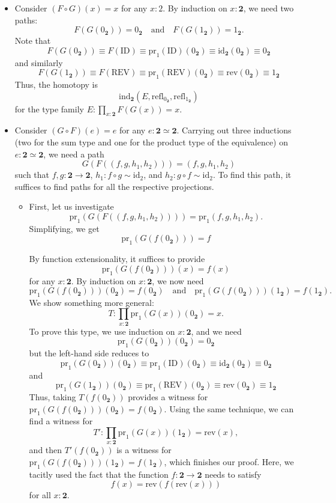 \documentclass[14pt]{extarticle}
\newcommand{\0}{{\mathbf 0}}
\newcommand{\1}{{\mathbf 1}}
\newcommand{\2}{{\mathbf 2}}
\newcommand{\ind}{\mathrm{ind}}
\newcommand{\refl}{\mathrm{refl}}
\newcommand{\pr}{\mathrm{pr}}
\newcommand{\id}{\mathrm{id}}
\begin{document}
\begin{itemize}
\item Consider $(F \circ G)(x) = x$ for any $x:2$. By induction on $x : \2$, we need two paths:
\[F(G(0_\2)) = 0_\2 \quad \text{and} \quad F(G(1_\2)) = 1_\2.\] Note that
\[F(G(0_\2)) \equiv F(\text{ID}) \equiv \pr_1(\text{ID})(0_\2) \equiv \id_\2(0_\2) \equiv 0_\2\] and similarly 
\[F(G(1_\2)) \equiv F(\text{REV}) \equiv \pr_1(\text{REV})(0_\2) \equiv \text{rev}(0_\2) \equiv 1_\2\] Thus, the homotopy is 
\[\ind_\2(E, \refl_{0_\2}, \refl_{1_\2})\]
for the type family $E : \prod_{x:\2} F(G(x)) = x$.

\item Consider $(G \circ F)(e) = e$ for any $e:\2 \simeq \2$. Carrying out three inductions (two for the sum type and one for the product type of the equivalence) on $e : \2 \simeq \2$, we need a path
\[G(F((f,g,h_1,h_2))) = (f,g,h_1,h_2)\] such that $f,g : \2 \to \2$, $h_1 : f \circ g \sim \id_2$, and $h_2 : g \circ f \sim \id_2$. To find this path, it suffices to find paths for all the respective projections.

\begin{itemize}
\item First, let us investigate \[\pr_1(G(F((f,g,h_1,h_2)))) = \pr_1(f,g,h_1,h_2).\] Simplifying, we get
\[\pr_1(G(f(0_\2))) = f\]

By function extensionality, it suffices to provide
\[\pr_1(G(f(0_\2)))(x) = f(x)\] for any $x : \2$. By induction on $x : \2$, we now need
\[\pr_1(G(f(0_\2)))(0_\2) = f(0_\2) \quad \text{and} \quad \pr_1(G(f(0_\2)))(1_\2) = f(1_\2).\] We show something more general:
\[T : \prod_{x:\2}\pr_1(G(x))(0_\2) = x.\] To prove this type, we use induction on $x : \2$, and we need
\[\pr_1(G(0_\2))(0_\2) = 0_\2\] but the left-hand side reduces to
\[\pr_1(G(0_\2))(0_\2) \equiv \pr_1(\text{ID})(0_\2) \equiv \id_\2(0_\2) \equiv 0_\2\] and 
\[\pr_1(G(1_\2))(0_\2) \equiv \pr_1(\text{REV})(0_\2) \equiv \text{rev}(0_\2) \equiv 1_\2\]
Thus, taking $T(f(0_\2))$ provides a witness for $\pr_1(G(f(0_\2)))(0_\2) = f(0_\2)$. Using the same technique, we can find a witness for
\[T' : \prod_{x:\2}\pr_1(G(x))(1_\2) = \text{rev}(x),\] and then $T'(f(0_\2))$ is a witness for $\pr_1(G(f(0_\2)))(1_\2) = f(1_\2)$, which finishes our proof. Here, we tacitly used the fact that the function $f:\2 \to \2$ needs to satisfy
\[f(x) = \text{rev}(f(\text{rev}(x)))\] for all $x : \2$.

\end{itemize}
\end{itemize}
\end{document}
